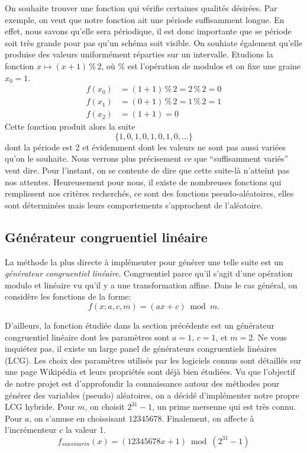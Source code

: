 \documentclass[10pt]{article} %
\begin{document}
On souhaite trouver une fonction qui vérifie certaines qualités désirées. Par exemple, on veut que notre fonction ait une période suffisamment longue. En effet, nous savons qu'elle sera périodique, il est donc importante que se période soit très grande pour pas qu'un schéma soit visible. On souhiate également qu'elle
produise des valeurs uniformément réparties sur un intervalle. Etudions la fonction $x \mapsto (x + 1) \mathbin{\%} 2$, où \% est l'opération de modulos et on fixe une graine $x_0 = 1$.
\begin{align*}
    f(x_0) &= (1 + 1) \mathbin{\%} 2 = 2 \mathbin{\%} 2 = 0 \\
    f(x_1) &= (0 + 1) \mathbin{\%} 2 = 1 \mathbin{\%} 2 = 1 \\
    f(x_2) &= (1 + 1) = 0
\end{align*}
Cette fonction produit alors la suite
\begin{equation*}
    \{1, 0, 1, 0, 1, 0, 1, 0, ...\}
\end{equation*}
dont la période est 2 et évidemment dont les valeurs ne sont pas aussi variées qu'on le souhaite. Nous verrons plus précisement ce que
``suffisamment variés'' veut dire. Pour l'instant, on se contente de dire que cette suite-là n'atteint pas nos attentes. Heureusement pour nous, il existe de nombreuses fonctions
qui remplissent nos critères recherchés, ce sont des fonctions pseudo-aléatoires, elles sont déterminées mais leurs comportements s'approchent de l'aléatoire.

\subsection{Générateur congruentiel linéaire}

La méthode la plus directe à implémenter pour générer une telle suite est un \textit{générateur congruentiel linéaire}. Congruentiel parce qu'il s'agit d'une opération modulo et
linéaire vu qu'il y a une transformation affine. Dans le cas général, on considère les fonctions de la forme:
$$
    f(x; a, c, m) = (ax + c) \bmod m.
$$

D'ailleurs, la fonction étudiée dans la section précédente est un générateur congruentiel linéaire dont les paramètres sont $a = 1$, $c = 1$, et $m = 2$. Ne vous inquiétez pas, il existe un large panel de
générateurs congruentiels linéaires (LCG). Les choix des paramètres utilisés par les logiciels connus sont détaillés sur une page Wikipédia et leurs propriétés sont déjà
bien étudiées. Vu que l'objectif de notre projet est d'approfondir la connaissance autour des méthodes pour générer des variables (pseudo) aléatoires, on a décidé d'implémenter notre propre LCG hybride.
Pour $m$, on choisit $2^{31} - 1$, un prime mersenne qui est très connu. Pour $a$, on s'amuse en choissisant $12345678$. Finalement, on affecte à l'incrémenteur $c$ la valeur 1.
$$
    f_{sousmarin}(x) = (12345678x + 1) \bmod (2^{31} - 1)
$$
\end{document}
